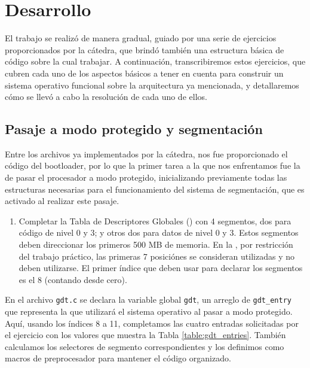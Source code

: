 \section{Desarrollo}

  El trabajo se realizó de manera gradual, guiado por una serie de ejercicios proporcionados por la cátedra, que brindó también una estructura básica de código sobre la cual trabajar. A continuación, transcribiremos estos ejercicios, que cubren cada uno de los aspectos básicos a tener en cuenta para construir un sistema operativo funcional sobre la arquitectura ya mencionada, y detallaremos cómo se llevó a cabo la resolución de cada uno de ellos.

  \subsection{Pasaje a modo protegido y segmentación}
    Entre los archivos ya implementados por la cátedra, nos fue proporcionado el código del bootloader, por lo que la primer tarea a la que nos enfrentamos fue la de pasar el procesador a modo protegido, inicializando previamente todas las estructuras necesarias para el funcionamiento del sistema de segmentación, que es activado al realizar este pasaje.

    \begin{enumerate}[label=(\alph*)]
      \item Completar la Tabla de Descriptores Globales () con 4 segmentos, dos para código de nivel 0 y 3; y otros dos para datos de nivel 0 y 3. Estos segmentos deben direccionar los primeros 500 MB de memoria. En la , por restricción del trabajo práctico, las primeras 7 posiciónes se consideran utilizadas y no deben utilizarse. El primer índice que deben usar para declarar los segmentos es el 8 (contando desde cero).
    \end{enumerate}

    En el archivo \texttt{gdt.c} se declara la variable global \texttt{gdt}, un arreglo de \texttt{gdt\_entry} que representa la  que utilizará el sistema operativo al pasar a modo protegido. Aquí, usando los índices 8 a 11, completamos las cuatro entradas solicitadas por el ejercicio con los valores que muestra la Tabla \ref{table:gdt_entries}. También calculamos los selectores de segmento correspondientes y los definimos como macros de preprocesador para mantener el código organizado.

